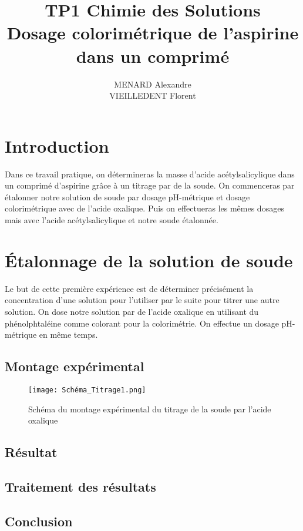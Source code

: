 \documentclass[12pt]{article}
\title{\textbf{TP1 Chimie des Solutions} \\ Dosage colorimétrique de l’aspirine dans un comprimé}
\author{MENARD Alexandre \\ VIEILLEDENT Florent}
\begin{document}
\maketitle

\section*{Introduction}

Dans ce travail pratique, on détermineras la masse d'acide acétylsalicylique dans un comprimé d'aspirine grâce à un titrage par de la soude. 
On commenceras par étalonner notre solution de soude par dosage pH-métrique et dosage colorimétrique avec de l'acide oxalique. Puis on effectueras les mêmes dosages mais avec l'acide acétylsalicylique et notre soude étalonnée. 
\newpage

\section{Étalonnage de la solution de soude}

Le but de cette première expérience est de déterminer précisément la concentration d'une solution pour l'utiliser par le suite pour titrer une autre solution. On dose notre solution par de l'acide oxalique en utilisant du phénolphtaléine comme colorant pour la colorimétrie. On effectue un dosage pH-métrique en même temps. 

	\subsection{Montage expérimental}
	
\begin{figure}[!h]
	\begin{center}
\texttt{[image: Schéma\_Titrage1.png]}
\label{Figure1}
\caption{Schéma du montage expérimental du titrage de la soude par l'acide oxalique}
\end{center}
\end{figure}
	
	\subsection{Résultat}

	\subsection{Traitement des résultats}
	
	\subsection{Conclusion}
	
\end{document}
